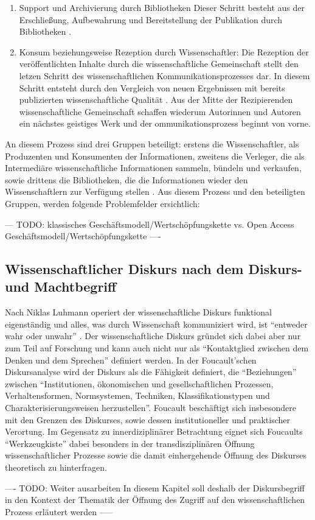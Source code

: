 \begin{enumerate}
\item Support und Archivierung durch Bibliotheken
Dieser Schritt besteht aus der Erschließung, Aufbewahrung und Bereitstellung der Publikation durch Bibliotheken \cite{schirmbacher_2009_wisspub}.
\item Konsum beziehungsweise Rezeption durch Wissenschaftler: 
Die Rezeption der veröffentlichten Inhalte durch die wissenschaftliche Gemeinschaft \cite{schirmbacher_2009_wisspub} stellt den letzen Schritt des wissenschaftlichen Kommunikationsprozesses dar. In diesem Schritt entsteht durch den Vergleich von neuen Ergebnissen mit bereits publizierten wissenschaftliche Qualität \cite{umstatter_2007_qualitatssicherung}. Aus der Mitte der Rezipierenden wissenschaftliche Gemeinschaft schaffen wiederum Autorinnen und Autoren ein nächstes geistiges Werk \cite{cite:11k} \cite{schirmbacher_2009_wisspub} und der ommunikationsprozess beginnt von vorne.
\end{enumerate}

An diesem Prozess sind drei Gruppen beteiligt: erstens die Wissenschaftler, als Produzenten und Konsumenten der Informationen, zweitens die Verleger, die als Intermediäre wissenschaftliche Informationen sammeln, bündeln und verkaufen, sowie drittens die Bibliotheken, die die Informationen wieder den Wissenschaftlern zur Verfügung stellen \cite{Odlyzko_1997}. Aus diesem Prozess und den beteiligten Gruppen, werden folgende Problemfelder ersichtlich:

--- TODO: klassisches Geschäftsmodell/Wertschöpfungskette vs. Open Access Geschäftsmodell/Wertschöpfungskette \cite{Hess_2006} ----

\subsection{Wissenschaftlicher Diskurs nach dem Diskurs- und Machtbegriff}
Nach Niklas Luhmann operiert der wissenschaftliche Diskurs funktional eigenständig und alles, was durch Wissenschaft kommuniziert wird, ist “entweder wahr oder unwahr” \cite{Luhmann1998}. Der wissenschaftliche Diskurs gründet sich dabei aber nur zum Teil auf Forschung und kann auch nicht nur als “Kontaktglied zwischen dem Denken und dem Sprechen” \cite{foucault_ordnung_2003} definiert werden. In der Foucault'schen Diskursanalyse wird der Diskurs als die Fähigkeit definiert, die “Beziehungen” zwischen “Institutionen, ökonomischen und gesellschaftlichen Prozessen, Verhaltensformen, Normsystemen, Techniken, Klassifikationstypen und Charakterisierungsweisen herzustellen”\cite{foucault_archaologie_1981}. Foucault beschäftigt sich insbesondere mit den Grenzen des Diskurses, sowie dessen institutioneller und praktischer Verortung. Im Gegensatz zu innerdiziplinärer Betrachtung eignet sich Foucaults “Werkzeugkiste”\cite{Honneth_2003} dabei besonders in der transdisziplinären Öffnung wissenschaftlicher Prozesse sowie die damit einhergehende Öffnung des Diskurses theoretisch zu hinterfragen. 

---- TODO: Weiter ausarbeiten In diesem Kapitel soll deshalb der Diskursbegriff in den Kontext der Thematik der Öffnung des Zugriff auf den wissenschaftlichen Prozess erläutert werden -----
